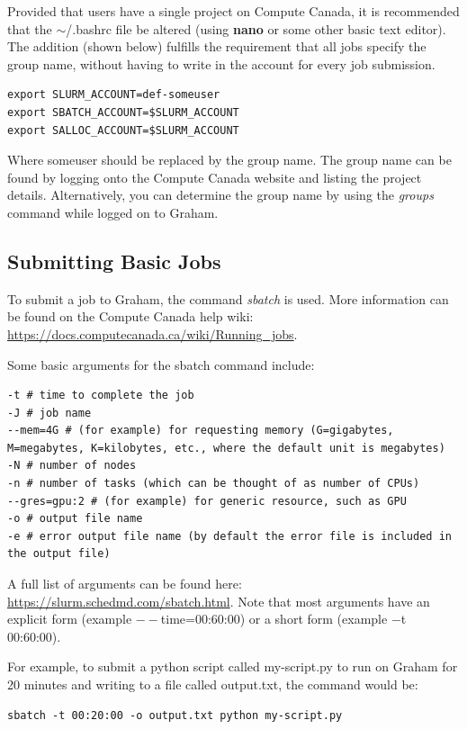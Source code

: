 \documentclass[12pt]{article}
\begin{document}
\quad Provided that users have a single project on Compute Canada, it is recommended that the $\sim$/.bashrc file be altered (using \textbf{nano} or some other basic text editor). The addition (shown below) fulfills the requirement that all jobs specify the group name, without having to write in the account for every job submission.

\begin{lstlisting}[numbers=none]
export SLURM_ACCOUNT=def-someuser
export SBATCH_ACCOUNT=$SLURM_ACCOUNT
export SALLOC_ACCOUNT=$SLURM_ACCOUNT 
\end{lstlisting}

Where someuser should be replaced by the group name. The group name can be found by logging onto the Compute Canada website and listing the project details. Alternatively, you can determine the group name by using the \textit{groups} command while logged on to Graham.



\subsection{Submitting Basic Jobs}
\quad\enskip\quad To submit a job to Graham, the command \textit{sbatch} is used. More information can be found on the Compute Canada help wiki: \url{https://docs.computecanada.ca/wiki/Running_jobs}.

\quad Some basic arguments for the sbatch command include:
\begin{lstlisting}[numbers=none, basicstyle=\normalsize]
-t # time to complete the job
-J # job name
--mem=4G # (for example) for requesting memory (G=gigabytes, M=megabytes, K=kilobytes, etc., where the default unit is megabytes) 
-N # number of nodes
-n # number of tasks (which can be thought of as number of CPUs) 
--gres=gpu:2 # (for example) for generic resource, such as GPU
-o # output file name
-e # error output file name (by default the error file is included in the output file)
\end{lstlisting}
 A full list of arguments can be found here: \url{https://slurm.schedmd.com/sbatch.html}. Note that most arguments have an explicit form (example $--$time=00:60:00) or a short form (example $-$t 00:60:00). 
 
\quad For example, to submit a python script called my-script.py to run on Graham for 20 minutes and writing to a file called output.txt, the command would be: 
\begin{lstlisting}[numbers=none, basicstyle=\normalsize]
sbatch -t 00:20:00 -o output.txt python my-script.py
\end{lstlisting}
\end{document}
